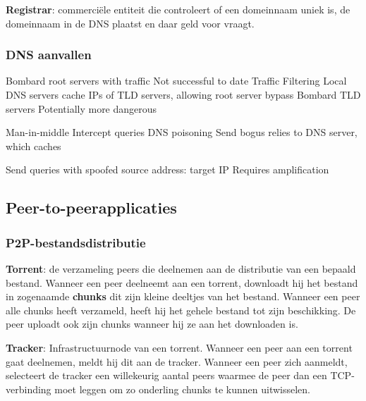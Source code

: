 
\textbf{Registrar}: commerciële entiteit die controleert of een domeinnaam uniek is, de domeinnaam in de DNS plaatst en daar geld voor vraagt.

\newpage

\subsubsection{DNS aanvallen}


\bi
\itf Bombard root servers with traffic
    \bi
    \itf Not successful to date
    \itf Traffic Filtering
    \itf Local DNS servers cache IPs of TLD servers, allowing root server bypass
    \ei
\itf Bombard TLD servers
    \bi
\itf Potentially more dangerous
    \ei
\ei


\bi
\itf Man-in-middle
    \bi
    \itf Intercept queries
    \ei
\itf DNS poisoning
    \bi
    \itf Send bogus relies to DNS server, which caches
    \ei
\ei


\bi
\itf Send queries with spoofed source address: target IP
\itf Requires amplification
\ei

\subsection{Peer-to-peerapplicaties}

\subsubsection{P2P-bestandsdistributie}

\noindent \textbf{Torrent}: de verzameling peers die deelnemen aan de distributie van een bepaald bestand. Wanneer een peer deelneemt aan een torrent, downloadt hij het bestand in zogenaamde \textbf{chunks} dit zijn kleine deeltjes van het bestand. Wanneer een peer alle chunks heeft verzameld, heeft hij het gehele bestand tot zijn beschikking. De peer uploadt ook zijn chunks wanneer hij ze aan het downloaden is.

\noindent \textbf{Tracker}: Infrastructuurnode van een torrent. Wanneer een peer aan een torrent gaat deelnemen, meldt hij dit aan de tracker. Wanneer een peer zich aanmeldt, selecteert de tracker een willekeurig aantal peers waarmee de peer dan een TCP-verbinding moet leggen om zo onderling chunks te kunnen uitwisselen.

